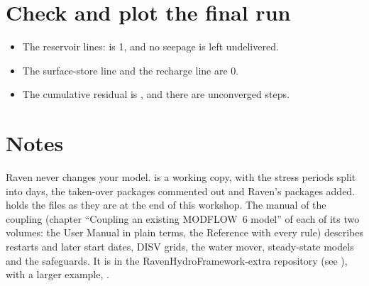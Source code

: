 \section{Check and plot the final run}

\begin{tocheck}
\begin{itemize}
\item The reservoir lines:  is 1, and no seepage is left undelivered.
\item The surface-store line and the recharge line are 0.
\item The cumulative residual is , and there are  unconverged steps.
\end{itemize}
\end{tocheck}


\section{Notes}
Raven never changes your model.  is a working copy, with the stress periods split into days, the taken-over
packages commented out and Raven's packages added.  holds the files as they are at the end of
this workshop. The manual of the coupling (chapter ``Coupling an existing MODFLOW~6 model'' of each of its two volumes:
the User Manual in plain terms, the Reference with every rule) describes restarts and later start dates, DISV grids, the
water mover, steady-state models and the safeguards. It is in the RavenHydroFramework-extra repository (see
), with a larger example, .
